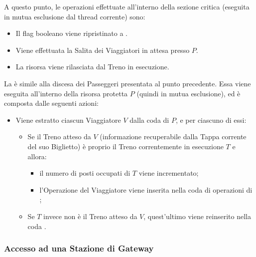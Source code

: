 \begin{description}
		A questo punto, le operazioni effettuate all'interno della sezione critica (eseguita in mutua esclusione dal thread corrente) sono:
		
			\begin{itemize}
				\item Il flag booleano  viene ripristinato a .
				\item Viene effettuata la Salita dei Viaggiatori in attesa presso $P$.
				\item La risorsa viene rilasciata dal Treno in esecuzione. 
			\end{itemize}
		
		La  è simile alla discesa dei Passeggeri presentata al punto precedente. Essa viene eseguita all'interno della risorsa protetta $P$ (quindi in mutua esclusione), ed è composta dalle seguenti azioni:
		\begin{itemize}
			\item Viene estratto ciascun Viaggiatore $V$ dalla coda  di $P$, e per ciascuno di essi:
			\begin{itemize}
				\item Se il Treno atteso da $V$ (informazione recuperabile dalla Tappa corrente del suo Biglietto) è proprio il Treno correntemente in esecuzione $T$ e  allora:
					\begin{itemize}
						\item il numero di posti occupati di $T$ viene incrementato;
						\item l'Operazione  del Viaggiatore viene inserita nella coda di operazioni di ;
					\end{itemize}
				\item Se $T$ invece non è il Treno atteso da $V$, quest'ultimo viene reinserito nella coda .
			\end {itemize}
		\end{itemize}
		
		
	\subsubsection{Accesso ad una Stazione di Gateway}\label{subsubsec:gateway_stations_func}
	
	\end {description}
	
		
